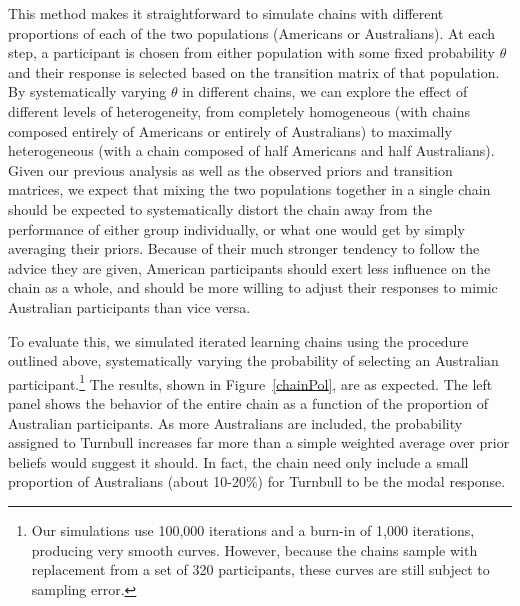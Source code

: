 \documentclass[doc]{apa6}
\begin{document}
This method makes it straightforward to simulate chains with different proportions of each of the two populations (Americans or Australians). At each step, a participant is chosen from either population with some fixed probability $\theta$ and their response is selected based on the transition matrix of that population. By systematically varying $\theta$ in different chains, we can explore the effect of different levels of heterogeneity, from completely homogeneous (with chains composed entirely of Americans or entirely of Australians) to maximally heterogeneous (with a chain composed of half Americans and half Australians). Given our previous analysis as well as the observed priors and transition matrices, we expect that mixing the two populations together in a single chain should be expected to systematically distort the chain away from the performance of either group individually, or what one would get by simply averaging their priors. Because of their much stronger tendency to follow the advice they are given, American participants should exert less influence on the chain as a whole, and should be more willing to adjust their responses to mimic Australian participants than vice versa. 

To evaluate this, we simulated iterated learning chains using the procedure outlined above, systematically varying the probability of selecting an Australian participant.\footnote{Our simulations use 100,000 iterations and a burn-in of 1,000 iterations, producing very smooth curves. However, because the chains sample with replacement from a set of 320 participants, these curves are still subject to sampling error.} The results, shown in Figure~\ref{chainPol}, are as expected. The left panel shows the behavior of the entire chain as a function of the proportion of Australian participants. As more Australians are included, the probability assigned to Turnbull increases far more than a simple weighted average over prior beliefs would suggest it should. In fact, the chain need only include a small proportion of Australians (about 10-20\%) for Turnbull to be the modal response. 
\end{document}
